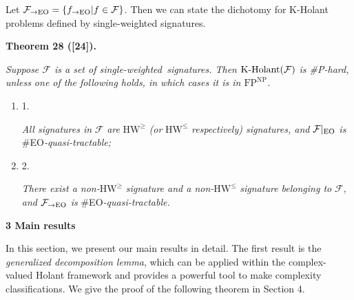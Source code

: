\documentclass[10pt,a4paper]{article}
\begin{document}
Let $\mathcal{F}_{\to\textup{{EO}}}=\{f_{\to\textup{{EO}}}|f\in\mathcal{F}\}$. Then we can state the dichotomy for K-Holant problems defined by single-weighted signatures.\par





\par\medskip\noindent\textbf{
\textbf{Theorem 28}\textbf{ }([24])\textbf{.}
}\par



\emph{Suppose $\mathcal{F}$ is a set of single-weighted signatures. Then $\textup{{K-Holant}}(\mathcal{F})$ is \#P-hard, unless one of the following holds, in which cases it is in $\text{FP}^{\text{NP}}$.}\par


\begin{enumerate}


\item[] 
1. 


\emph{All signatures in }$\mathcal{F}$\emph{ are }$\text{HW}^{\geq}$\emph{ (or }$\text{HW}^{\leq}$\emph{ respectively) signatures, and }$\mathcal{F}|_{\textup{{EO}}}$\emph{ is }\#EO\emph{-quasi-tractable;}\par





\item[] 
2. 


\emph{There exist a non-}$\text{HW}^{\geq}$\emph{ signature and a non-}$\text{HW}^{\leq}$\emph{ signature belonging to }$\mathcal{F}$\emph{, and }$\mathcal{F}_{\to\textup{{EO}}}$\emph{ is }\#EO\emph{-quasi-tractable.}\par





\end{enumerate}









\par\medskip\noindent\textbf{
3 Main results}\par




In this section, we present our main results in detail. The first result is the \emph{generalized decomposition lemma}, which can be applied within the complex-valued Holant framework and provides a powerful tool to make complexity classifications. We give the proof of the following theorem in Section 4.\par
\end{document}
